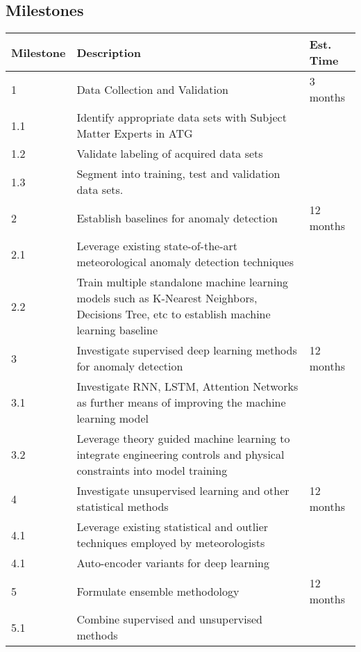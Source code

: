 \subsection{Milestones}

\begin{center}
    \begin{tabular}{|l|p{12cm}|l|}
        \hline
        Milestone & Description & Est. Time \\
        \hline
        \rowcolor{gray!50}
        1 & Data Collection and Validation & 3 months \\
        \hline
        1.1 & Identify appropriate data sets with Subject Matter Experts in ATG  & \\
        \hline
        1.2 & Validate labeling of acquired data sets  & \\
        \hline
        1.3 & Segment into training, test and validation data sets. & \\
        \hline
        \rowcolor{gray!50}
        2 & Establish baselines for anomaly detection& 12 months \\
        \hline
        2.1 &  Leverage existing state-of-the-art meteorological anomaly detection techniques  & \\
        \hline
        2.2 &  Train multiple standalone machine learning models such as K-Nearest Neighbors, Decisions Tree, etc to establish machine learning baseline & \\
        \hline
        \rowcolor{gray!50}

        3 &  Investigate supervised deep learning methods for anomaly detection & 12 months\\
        \hline
        3.1 &  Investigate RNN, LSTM, Attention Networks as further means of improving the machine learning model & \\
        \hline
        3.2 &  Leverage theory guided machine learning to integrate engineering controls and physical constraints into model training & \\
        \hline

        \rowcolor{gray!50}
        4 & Investigate unsupervised learning and other statistical methods & 12 months\\
        \hline
        4.1 &  Leverage existing statistical and outlier techniques employed by meteorologists & \\
        \hline
        4.1 &  Auto-encoder variants for deep learning & \\
        \hline

        \rowcolor{gray!50}
        5 & Formulate ensemble methodology & 12 months \\
        \hline
        5.1 &  Combine supervised and unsupervised methods  & \\

        \hline
    \end{tabular}
\end{center}

